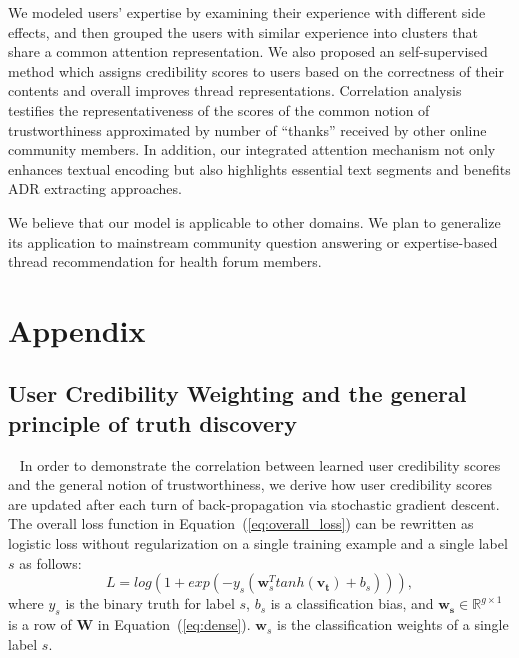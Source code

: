 \documentclass{bmcart}
\begin{document}
We modeled users' expertise by examining their experience with different side effects, and then grouped the users with similar experience into clusters that
share a common attention representation. We also proposed an self-supervised method which assigns credibility scores to users based on the correctness of their contents and overall improves thread representations. Correlation analysis testifies the representativeness of the scores of the common notion of trustworthiness approximated by number of ``thanks'' received by other online community members. In addition, our integrated attention mechanism not only enhances textual encoding but also highlights essential text segments and benefits ADR extracting approaches.

We believe that our model is applicable to other domains. We plan to generalize its application to mainstream community question answering or expertise-based thread recommendation for health forum members.


\newpage
\section*{Appendix}
\subsection{User Credibility Weighting and the general principle of truth discovery}~\label{appendix:math}
In order to demonstrate the correlation between learned user credibility scores and the general notion of trustworthiness, we derive how user credibility scores are updated after each turn of back-propagation via stochastic gradient descent.
The overall loss function in Equation~(\ref{eq:overall_loss}) can be rewritten as logistic loss without regularization on a single training example and a single label $s$ as follows: 
\begin{equation}
    L = log(1+exp(-y_s(\boldsymbol{w}_{s}^T tanh(\boldsymbol{v_t})+b_s))), 
\end{equation}
where $y_s$ is the binary truth for label $s$, $b_s$ is a classification bias, and $\boldsymbol{w_s}\in \mathbb{R}^{g\times1}$ is a row of $\boldsymbol{W}$ in Equation~(\ref{eq:dense}). $\boldsymbol{w}_{s}$ is the classification weights of a single label $s$.
\end{document}
